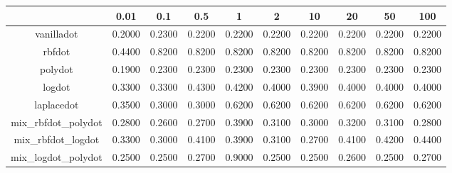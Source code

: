 \begin{table}[ht]
\centering
\begin{tabular}{cccccccccc}
  \hline
 & 0.01 & 0.1 & 0.5 & 1 & 2 & 10 & 20 & 50 & 100 \\ 
  \hline
vanilladot & 0.2000 & 0.2300 & 0.2200 & 0.2200 & 0.2200 & 0.2200 & 0.2200 & 0.2200 & 0.2200 \\ 
  rbfdot & 0.4400 & 0.8200 & 0.8200 & 0.8200 & 0.8200 & 0.8200 & 0.8200 & 0.8200 & 0.8200 \\ 
  polydot & 0.1900 & 0.2300 & 0.2300 & 0.2300 & 0.2300 & 0.2300 & 0.2300 & 0.2300 & 0.2300 \\ 
  logdot & 0.3300 & 0.3300 & 0.4300 & 0.4200 & 0.4000 & 0.3900 & 0.4000 & 0.4000 & 0.4000 \\ 
  laplacedot & 0.3500 & 0.3000 & 0.3000 & 0.6200 & 0.6200 & 0.6200 & 0.6200 & 0.6200 & 0.6200 \\ 
  mix\_rbfdot\_polydot & 0.2800 & 0.2600 & 0.2700 & 0.3900 & 0.3100 & 0.3000 & 0.3200 & 0.3100 & 0.2800 \\ 
  mix\_rbfdot\_logdot & 0.3300 & 0.3000 & 0.4100 & 0.3900 & 0.3100 & 0.2700 & 0.4100 & 0.4200 & 0.4400 \\ 
  mix\_logdot\_polydot & 0.2500 & 0.2500 & 0.2700 & 0.9000 & 0.2500 & 0.2500 & 0.2600 & 0.2500 & 0.2700 \\ 
   \hline
\end{tabular}
\end{table}
